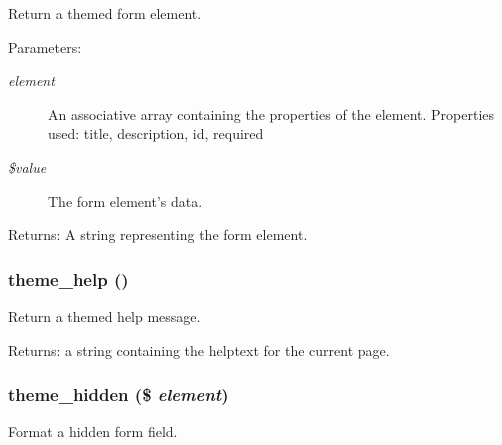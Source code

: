 Return a themed form element.

\begin{Desc}
\item[Parameters:]
\begin{description}
\item[{\em element}]An associative array containing the properties of the element. Properties used: title, description, id, required \item[{\em \$value}]The form element's data. \end{description}
\end{Desc}
\begin{Desc}
\item[Returns:]A string representing the form element. \end{Desc}
\hypertarget{group__themeable_ge7158ac517c2c15972c742ef074d366d}{
\subsubsection[{theme\_\-help}]{\setlength{\rightskip}{0pt plus 5cm}theme\_\-help ()}}
\label{group__themeable_ge7158ac517c2c15972c742ef074d366d}


Return a themed help message.

\begin{Desc}
\item[Returns:]a string containing the helptext for the current page. \end{Desc}
\hypertarget{group__themeable_g4c3dee9315931d8403bf37aa6481cffb}{
\subsubsection[{theme\_\-hidden}]{\setlength{\rightskip}{0pt plus 5cm}theme\_\-hidden (\$ {\em element})}}
\label{group__themeable_g4c3dee9315931d8403bf37aa6481cffb}


Format a hidden form field.

